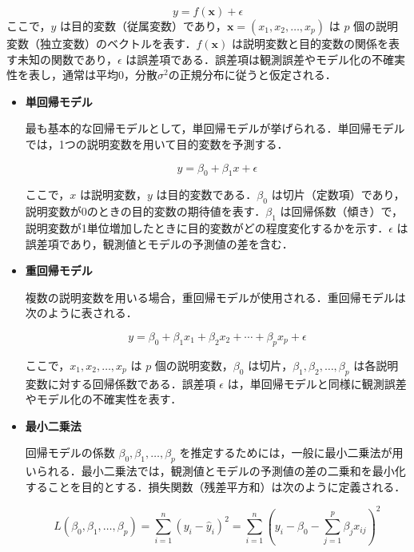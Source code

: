 \begin{equation}
	y = f(\mathbf{x}) + \epsilon
\end{equation}
ここで，$y$ は目的変数（従属変数）であり，$\mathbf{x} = (x_1, x_2, \ldots, x_p)$ は $p$ 個の説明変数（独立変数）のベクトルを表す．$f(\mathbf{x})$ は説明変数と目的変数の関係を表す未知の関数であり，$\epsilon$ は誤差項である．誤差項は観測誤差やモデル化の不確実性を表し，通常は平均0，分散$\sigma^2$の正規分布に従うと仮定される．
\begin{itemize}
	\item \textbf{単回帰モデル}
	
	最も基本的な回帰モデルとして，単回帰モデルが挙げられる．単回帰モデルでは，1つの説明変数を用いて目的変数を予測する\cite{prml}．
	
	\begin{equation}
		y = \beta_0 + \beta_1 x + \epsilon
	\end{equation}
	
	ここで，$x$ は説明変数，$y$ は目的変数である．$\beta_0$ は切片（定数項）であり，説明変数が0のときの目的変数の期待値を表す．$\beta_1$ は回帰係数（傾き）で，説明変数が1単位増加したときに目的変数がどの程度変化するかを示す．$\epsilon$ は誤差項であり，観測値とモデルの予測値の差を含む．
	
	\item \textbf{重回帰モデル}
	
	複数の説明変数を用いる場合，重回帰モデルが使用される\cite{prml}．重回帰モデルは次のように表される．
	
	\begin{equation}
		y = \beta_0 + \beta_1 x_1 + \beta_2 x_2 + \cdots + \beta_p x_p + \epsilon
	\end{equation}
	
	ここで，$x_1, x_2, \ldots, x_p$ は $p$ 個の説明変数，$\beta_0$ は切片，$\beta_1, \beta_2, \ldots, \beta_p$ は各説明変数に対する回帰係数である．誤差項 $\epsilon$ は，単回帰モデルと同様に観測誤差やモデル化の不確実性を表す．
	
	\item \textbf{最小二乗法}
	
	回帰モデルの係数 $\beta_0, \beta_1, \ldots, \beta_p$ を推定するためには，一般に最小二乗法が用いられる\cite{prml}．最小二乗法では，観測値とモデルの予測値の差の二乗和を最小化することを目的とする．損失関数（残差平方和）は次のように定義される．
	
	\begin{equation}
		L(\beta_0, \beta_1, \ldots, \beta_p) = \sum_{i=1}^{n} (y_i - \hat{y}_i)^2 = \sum_{i=1}^{n} (y_i - \beta_0 - \sum_{j=1}^{p} \beta_j x_{ij})^2
	\end{equation}
	

\end{itemize}
